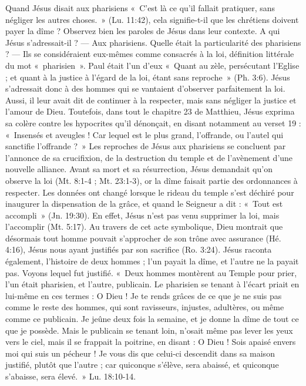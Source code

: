 \begin{multicols}{2}
{Quand Jésus disait aux pharisiens «~C’est là ce qu’il fallait pratiquer, sans négliger les autres choses.~» (Lu. 11:42), cela signifie-t-il que les chrétiens doivent payer la dîme ? 
Observez bien les paroles de Jésus dans leur contexte. 
A qui Jésus s’adressait-il ? — Aux pharisiens. Quelle était la particularité des pharisiens ? — Ils se considéraient eux-mêmes comme consacrés à la loi, définition littérale du mot «~pharisien~». Paul était l'un d'eux «~Quant au zèle, persécutant l'Eglise ; et quant à la justice à l’égard de la loi, étant sans reproche~» (Ph. 3:6). Jésus s’adressait donc à des hommes qui se vantaient d’observer parfaitement la loi. Aussi, il leur avait dit de continuer à la respecter, mais sans négliger la justice et l’amour de Dieu. Toutefois, dans tout le chapitre 23 de Matthieu, Jésus exprima sa colère contre les hypocrites qu’il dénonçait, en disant notamment au verset 19 : «~Insensés et aveugles ! Car lequel est le plus grand, l’offrande, ou l'autel qui sanctifie l’offrande ?~» Les reproches de Jésus aux pharisiens se concluent par l’annonce de sa crucifixion, de la destruction du temple et de l’avènement d’une nouvelle alliance. Avant sa mort et sa résurrection, Jésus demandait qu’on observe la loi (Mt. 8:1-4 ; Mt. 23:1-3), or la dîme faisait partie des ordonnances à respecter. Les données ont changé lorsque le rideau du temple s'est déchiré pour inaugurer la dispensation de la grâce, et quand le Seigneur a dit : «~Tout est accompli~» (Jn. 19:30). En effet, Jésus n'est pas venu supprimer la loi, mais l'accomplir (Mt. 5:17). Au travers de cet acte symbolique, Dieu montrait que désormais tout homme pouvait s'approcher de son trône avec assurance (Hé. 4:16), Jésus nous ayant justifiés par son sacrifice (Ro. 3:24). Jésus raconta également, l’histoire de deux hommes ; l’un payait la dîme, et l’autre ne la payait pas. Voyons lequel fut justifié. «~Deux hommes montèrent au Temple pour prier, l'un était pharisien, et l'autre, publicain. Le pharisien se tenant à l'écart priait en lui-même en ces termes : O Dieu ! Je te rends grâces de ce que je ne suis pas comme le reste des hommes, qui sont ravisseurs, injustes, adultères, ou même comme ce publicain. Je jeûne deux fois la semaine, et je donne la dîme de tout ce que je possède. Mais le publicain se tenant loin, n'osait même pas lever les yeux vers le ciel, mais il se frappait la poitrine, en disant : O Dieu ! Sois apaisé envers moi qui suis un pécheur ! Je vous dis que celui-ci descendit dans sa maison justifié, plutôt que l'autre ; car quiconque s'élève, sera abaissé, et quiconque s'abaisse, sera élevé.~» Lu. 18:10-14.
}
\end{multicols}
